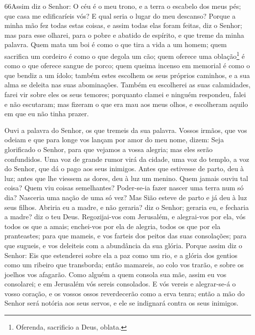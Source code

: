 \lettrine{66}{}Assim diz o Senhor: O céu é o meu trono, e a
terra o escabelo dos meus pés; que casa me edificaríeis vós? E qual
seria o lugar do meu descanso? Porque a minha mão fez todas
estas coisas, e assim todas elas foram feitas, diz o Senhor; mas
para esse olharei, para o pobre e abatido de espírito, e que treme
da minha palavra. Quem mata um boi é como o que tira a vida a um
homem; quem sacrifica um cordeiro é como o que degola um cão; quem
oferece uma oblação\footnote{Oferenda, sacrificio a Deus, oblata.} é
como o que oferece sangue de porco; quem queima incenso em memorial
é como o que bendiz a um ídolo; também estes escolhem os seus
próprios caminhos, e a sua alma se deleita nas suas abominações.
Também eu escolherei as suas calamidades, farei vir sobre eles
os seus temores; porquanto clamei e ninguém respondeu, falei e não
escutaram; mas fizeram o que era mau aos meus olhos, e escolheram
aquilo em que eu não tinha prazer.

Ouvi a palavra do Senhor, os que tremeis da sua palavra. Vossos
irmãos, que vos odeiam e que para longe vos lançam por amor do meu
nome, dizem: Seja glorificado o Senhor, para que vejamos a vossa
alegria; mas eles serão confundidos. Uma voz de grande rumor
virá da cidade, uma voz do templo, a voz do Senhor, que dá o pago
aos seus inimigos. Antes que estivesse de parto, deu à luz;
antes que lhe viessem as dores, deu à luz um menino. Quem jamais
ouviu tal coisa? Quem viu coisas semelhantes? Poder-se-ia fazer
nascer uma terra num só dia? Nasceria uma nação de uma só vez? Mas
Sião esteve de parto e já deu à luz seus filhos. Abriria eu a
madre, e não geraria? diz o Senhor; geraria eu, e fecharia a madre?
diz o teu Deus. Regozijai-vos com Jerusalém, e alegrai-vos
por ela, vós todos os que a amais; enchei-vos por ela de alegria,
todos os que por ela pranteastes; para que mameis, e vos
farteis dos peitos das suas consolações; para que sugueis, e vos
deleiteis com a abundância da sua glória. Porque assim diz o
Senhor: Eis que estenderei sobre ela a paz como um rio, e a glória
dos gentios como um ribeiro que transborda; então mamareis, ao colo
vos trarão, e sobre os joelhos vos afagarão. Como alguém a
quem consola sua mãe, assim eu vos consolarei; e em Jerusalém vós
sereis consolados. E vós vereis e alegrar-se-á o vosso
coração, e os vossos ossos reverdecerão como a erva tenra; então a
mão do Senhor será notória aos seus servos, e ele se indignará
contra os seus inimigos.

